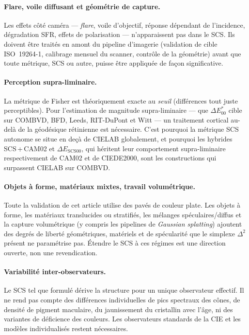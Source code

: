 \documentclass[12pt,a4paper]{article}
\begin{document}
\paragraph{Flare, voile diffusant et g\'eom\'etrie de capture.}
Les effets c\^ot\'e cam\'era --- \emph{flare}, voile d'objectif,
r\'eponse d\'ependant de l'incidence, d\'egradation SFR, effets de
polarisation --- n'apparaissent pas dans le SCS. Ils doivent \^etre
trait\'es en amont du pipeline d'imagerie (validation de cible
ISO~19264-1, calibrage mensuel du scanner, contr\^ole de la
g\'eom\'etrie) avant que toute m\'etrique, SCS ou autre, puisse
\^etre appliqu\'ee de fa\c{c}on significative.

\paragraph{Perception supra-liminaire.}
La m\'etrique de Fisher est th\'eoriquement exacte au \emph{seuil}
(diff\'erences tout juste perceptibles). Pour l'estimation de
magnitude supra-liminaire --- que $\Delta E^*_{00}$ cible sur
COMBVD, BFD, Leeds, RIT-DuPont et Witt --- un traitement cortical
au-del\`a de la g\'eod\'esique r\'etinienne est n\'ecessaire. C'est
pourquoi la m\'etrique SCS autonome se situe en de\c{c}\`a de CIELAB
globalement, et pourquoi les hybrides SCS\,+\,CAM02 et
$\Delta E_{\mathrm{SCS00}}$, qui h\'eritent leur comportement
supra-liminaire respectivement de CAM02 et de CIEDE2000, sont les
constructions qui surpassent CIELAB sur COMBVD.

\paragraph{Objets \`a forme, mat\'eriaux mixtes, travail volum\'etrique.}
Toute la validation de cet article utilise des pav\'es de couleur
plate. Les objets \`a forme, les mat\'eriaux translucides ou
stratifi\'es, les m\'elanges sp\'eculaires/diffus et la capture
volum\'etrique (y compris les pipelines de \emph{Gaussian splatting})
ajoutent des degr\'es de libert\'e g\'eom\'etriques, mat\'eriels et
de sp\'ecularit\'e que le simplexe $\Delta^2$ pr\'esent ne
param\'etrise pas. \'Etendre le SCS \`a ces r\'egimes est une
direction ouverte, non une revendication.

\paragraph{Variabilit\'e inter-observateurs.}
Le SCS tel que formul\'e d\'erive la structure pour un unique
observateur effectif. Il ne rend pas compte des diff\'erences
individuelles de pics spectraux des c\^ones, de densit\'e de pigment
maculaire, du jaunissement du cristallin avec l'\^age, ni des
variantes de d\'eficience des couleurs. Les observateurs standards de
la CIE et les mod\`eles individualis\'es restent n\'ecessaires.
\end{document}
